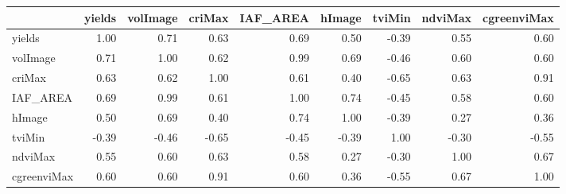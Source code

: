 \begin{tabular}{lrrrrrrrr}
\toprule
{} &  yields &  volImage &  criMax &  IAF\_AREA &  hImage &  tviMin &  ndviMax &  cgreenviMax \\
\midrule
yields      &    1.00 &      0.71 &    0.63 &      0.69 &    0.50 &   -0.39 &     0.55 &         0.60 \\
volImage    &    0.71 &      1.00 &    0.62 &      0.99 &    0.69 &   -0.46 &     0.60 &         0.60 \\
criMax      &    0.63 &      0.62 &    1.00 &      0.61 &    0.40 &   -0.65 &     0.63 &         0.91 \\
IAF\_AREA    &    0.69 &      0.99 &    0.61 &      1.00 &    0.74 &   -0.45 &     0.58 &         0.60 \\
hImage      &    0.50 &      0.69 &    0.40 &      0.74 &    1.00 &   -0.39 &     0.27 &         0.36 \\
tviMin      &   -0.39 &     -0.46 &   -0.65 &     -0.45 &   -0.39 &    1.00 &    -0.30 &        -0.55 \\
ndviMax     &    0.55 &      0.60 &    0.63 &      0.58 &    0.27 &   -0.30 &     1.00 &         0.67 \\
cgreenviMax &    0.60 &      0.60 &    0.91 &      0.60 &    0.36 &   -0.55 &     0.67 &         1.00 \\
\bottomrule
\end{tabular}
